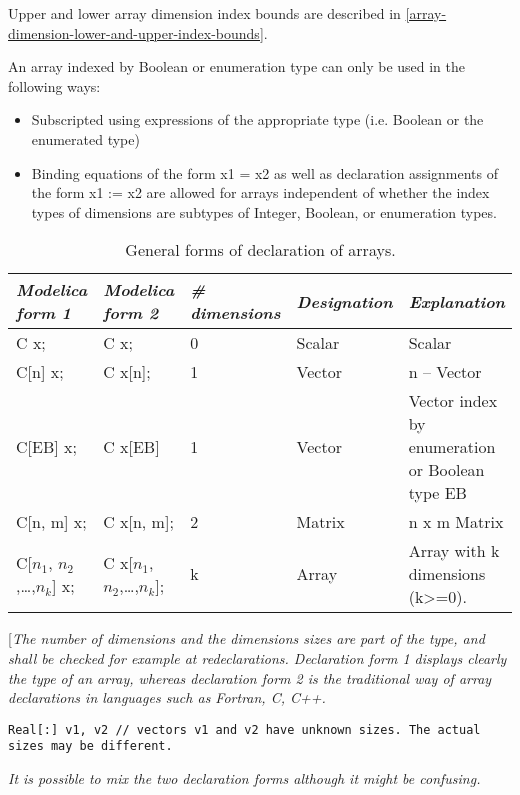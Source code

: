 Upper and lower array dimension index bounds are described in \autoref{array-dimension-lower-and-upper-index-bounds}.

An array indexed by Boolean or enumeration type can only be used in the
following ways:

\begin{itemize}
\item
  Subscripted using expressions of the appropriate type (i.e. Boolean or
  the enumerated type)
\item
  Binding equations of the form x1 = x2 as well as declaration
  assignments of the form x1 := x2 are allowed for arrays independent of
  whether the index types of dimensions are subtypes of Integer,
  Boolean, or enumeration types.
\end{itemize}

\begin{longtable}{|l|l|l|l|p{4cm}|}
\caption{General forms of declaration of arrays.}\\
\hline
\emph{Modelica form 1} & \emph{Modelica form 2} & \emph{\# dimensions} & \emph{Designation} & \emph{Explanation}\\ \hline
\endhead
C x; & C x; & 0 & Scalar & Scalar\\ \hline
C{[}n{]} x; & C x{[}n{]}; & 1 & Vector & n -- Vector\\ \hline
C{[}EB{]} x; & C x{[}EB{]} & 1 & Vector & Vector index by enumeration or
Boolean type EB\\ \hline
C{[}n, m{]} x; & C x{[}n, m{]}; & 2 & Matrix & n x m
Matrix\\ \hline
C{[}$n_1$, $n_{2}$,\ldots{},$n_k${]} x; & C x{[}$n_1$, $n_2$,\ldots{},$n_k${]}; & k & Array & Array with k dimensions
(k\textgreater{}=0).\\ \hline
\end{longtable}

{[}\emph{The number of dimensions and the dimensions sizes are part of
the type, and shall be checked for example at redeclarations.
Declaration form 1 displays clearly the type of an array, whereas
declaration form 2 is the traditional way of array declarations in
languages such as Fortran, C, C++.}

\begin{lstlisting}[language=modelica]
  Real[:] v1, v2 // vectors v1 and v2 have unknown sizes. The actual sizes may be different.
\end{lstlisting}

\emph{It is possible to mix the two declaration forms although it might
be confusing.}


